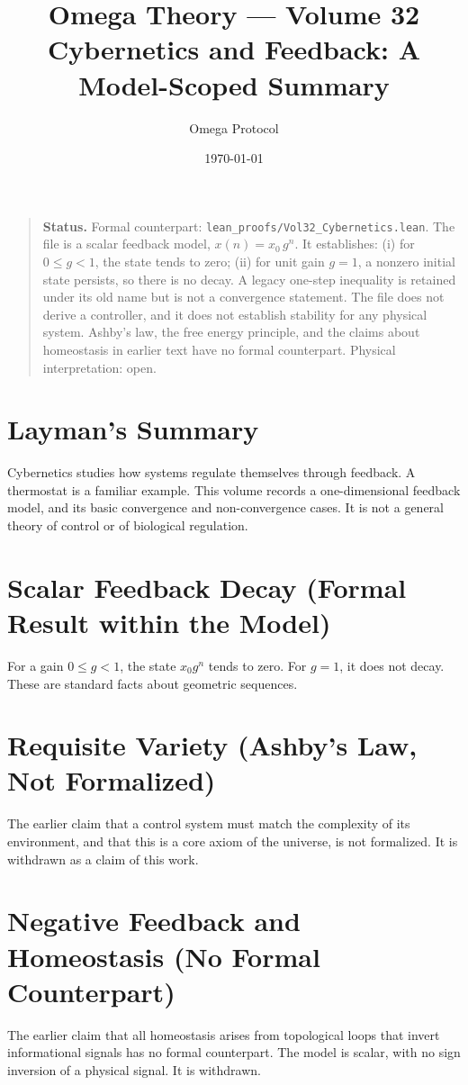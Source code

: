 \documentclass[11pt, a4paper]{article}
\title{Omega Theory --- Volume 32\\\Large Cybernetics and Feedback: A Model-Scoped Summary}
\author{Omega Protocol}
\date{\today}
\begin{document}
\maketitle

\begin{quote}
\textbf{Status.} Formal counterpart: \texttt{lean\_proofs/Vol32\_Cybernetics.lean}. The file is a scalar feedback model, $x(n) = x_0\, g^n$. It establishes: (i) for $0 \le g < 1$, the state tends to zero; (ii) for unit gain $g = 1$, a nonzero initial state persists, so there is no decay. A legacy one-step inequality is retained under its old name but is not a convergence statement. The file does not derive a controller, and it does not establish stability for any physical system. Ashby's law, the free energy principle, and the claims about homeostasis in earlier text have no formal counterpart. Physical interpretation: open.
\end{quote}

\section*{Layman's Summary}
Cybernetics studies how systems regulate themselves through feedback. A thermostat is a familiar example. This volume records a one-dimensional feedback model, and its basic convergence and non-convergence cases. It is not a general theory of control or of biological regulation.

\section{Scalar Feedback Decay (Formal Result within the Model)}
For a gain $0 \le g < 1$, the state $x_0 g^n$ tends to zero. For $g = 1$, it does not decay. These are standard facts about geometric sequences.

\section{Requisite Variety (Ashby's Law, Not Formalized)}
The earlier claim that a control system must match the complexity of its environment, and that this is a core axiom of the universe, is not formalized. It is withdrawn as a claim of this work.

\section{Negative Feedback and Homeostasis (No Formal Counterpart)}
The earlier claim that all homeostasis arises from topological loops that invert informational signals has no formal counterpart. The model is scalar, with no sign inversion of a physical signal. It is withdrawn.
\end{document}
